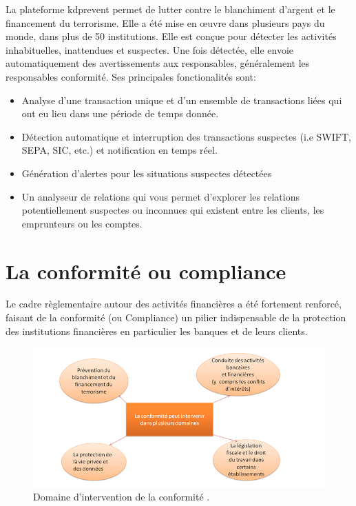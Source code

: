 La plateforme kdprevent permet de lutter contre le blanchiment d'argent et le 
financement du terrorisme. Elle a été mise en œuvre dans plusieurs pays du 
monde, dans plus de 50 institutions. Elle  est conçue pour détecter les 
activités inhabituelles, inattendues et suspectes. Une fois détectée, elle 
envoie automatiquement des avertissements aux responsables, généralement les 
responsables conformité.
Ses principales fonctionalités sont:
\begin{itemize}
  \item Analyse d'une transaction unique et d'un ensemble de transactions 
    liées qui ont eu lieu dans une période de temps donnée.
  \item Détection automatique et interruption des transactions suspectes
    (i.e SWIFT, SEPA, SIC, etc.) et notification en temps réel.
  \item Génération d'alertes pour les situations suspectes détectées
  \item Un analyseur de relations qui vous permet d'explorer les relations 
    potentiellement suspectes ou inconnues qui existent entre les clients,
    les emprunteurs ou les comptes.
\end{itemize}


\section{La conformité ou compliance}

Le cadre règlementaire autour des activités financières a été fortement
renforcé, faisant de la conformité (ou Compliance) un pilier indispensable
de la protection des institutions financières en particulier les banques 
et de leurs clients. \cite{arnaud2015}

  \begin{figure}[h!]
    \begin{center}
      \includegraphics[width=14cm]{images/domaineconformite.png}
        \caption{Domaine d'intervention de la conformité
        .\label{fig:domaineconformite}}
    \end{center}
  \end{figure}

